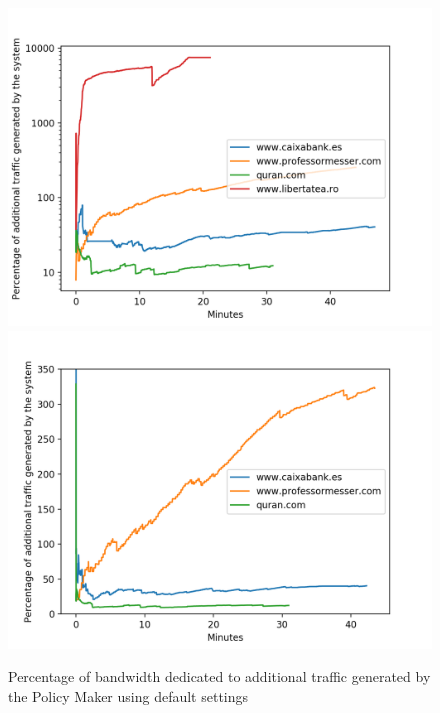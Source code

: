 \begin{description}
\begin{figure}[h]
	\centering
	\includegraphics[width=\textwidth]{imgs/netword_usage_plot.png}
	\includegraphics[width=\textwidth]{imgs/netword_usage_long_plot.png}
	\caption{Percentage of bandwidth dedicated to additional traffic generated by the Policy Maker using default settings}
	\label{standarUsage}
\end{figure}


\end{description}
